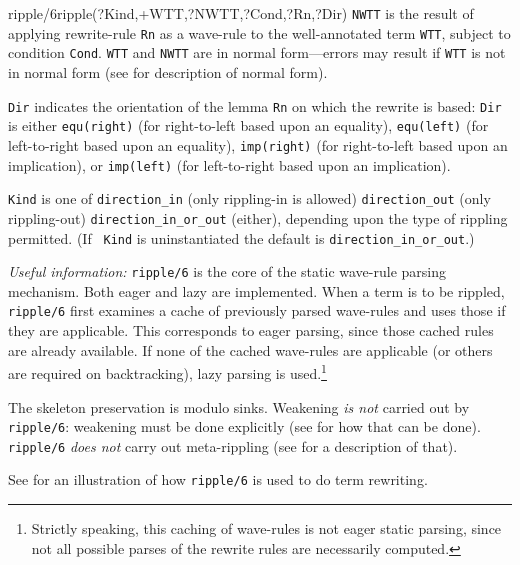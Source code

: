 \begin{predicate}{ripple/6}{ripple(?Kind,+WTT,?NWTT,?Cond,?Rn,?Dir)}%
{\tt NWTT} is the result of applying rewrite-rule {\tt Rn} as a
wave-rule to the well-annotated term {\tt WTT}, subject to condition
{\tt Cond}.  {\tt WTT} and {\tt NWTT} are in normal form---errors may
result if {\tt WTT} is not in normal form (see 
for description of normal form).

{\tt Dir} indicates the orientation of the lemma {\tt Rn} on which the
rewrite is based: {\tt Dir} is either {\tt equ(right)} (for
right-to-left based upon an equality), {\tt equ(left)} (for
left-to-right based upon an equality), {\tt imp(right)} (for
right-to-left based upon an implication), or {\tt imp(left)} (for
left-to-right based upon an implication).

{\tt Kind} is one of \verb|direction_in| (only rippling-in is allowed)
\verb|direction_out| (only rippling-out) \verb|direction_in_or_out|
(either), depending upon the type of rippling permitted.  (If {\tt
Kind} is uninstantiated the default is \verb|direction_in_or_out|.)

{\sl Useful information:\/} {\tt ripple/6} is the core of the static
wave-rule parsing mechanism.  Both eager
and lazy are implemented.  When a term is
to be rippled, {\tt ripple/6} first examines a cache of previously
parsed wave-rules and uses those if they are applicable.  This
corresponds to eager parsing, since those cached rules are already
available.  If none of the cached wave-rules are applicable (or others
are required on backtracking), lazy parsing is used.\footnote
{Strictly speaking, this caching of wave-rules is not eager static
parsing, since not all possible parses of the rewrite rules are
necessarily computed.}


The skeleton preservation is modulo
sinks.  Weakening {\em is not\/} carried out by {\tt ripple/6}:
weakening must be done explicitly (see  for how that can be
done).  {\tt ripple/6} {\em does not\/} carry out meta-rippling (see
 for a description of that).





See  for an illustration of how {\tt ripple/6} is used to do
term rewriting.
\end{predicate}



